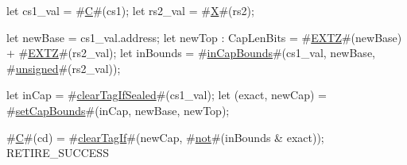 let cs1_val = #\hyperref[sailRISCVzC]{C}#(cs1);
let rs2_val = #\hyperref[sailRISCVzX]{X}#(rs2);

let newBase = cs1_val.address;
let newTop : CapLenBits = #\hyperref[sailRISCVzEXTZ]{EXTZ}#(newBase) + #\hyperref[sailRISCVzEXTZ]{EXTZ}#(rs2_val);
let inBounds = #\hyperref[sailRISCVzinCapBounds]{inCapBounds}#(cs1_val, newBase, #\hyperref[sailRISCVzunsigned]{unsigned}#(rs2_val));

let inCap = #\hyperref[sailRISCVzclearTagIfSealed]{clearTagIfSealed}#(cs1_val);
let (exact, newCap) = #\hyperref[sailRISCVzsetCapBounds]{setCapBounds}#(inCap, newBase, newTop);

#\hyperref[sailRISCVzC]{C}#(cd) = #\hyperref[sailRISCVzclearTagIf]{clearTagIf}#(newCap, #\hyperref[sailRISCVznot]{not}#(inBounds & exact));
RETIRE_SUCCESS
